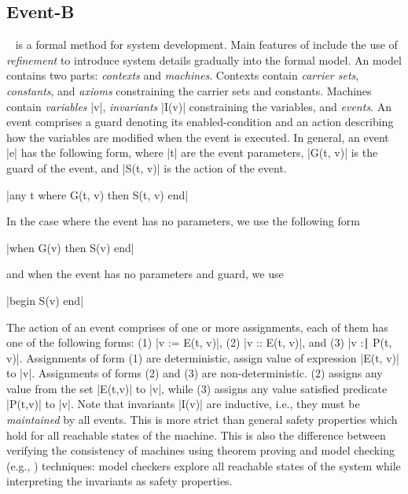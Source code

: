 
\subsection{Event-B}
\label{sec:eventb}

\EventB~\cite{abrial10:_model_event_b} is a formal method for system
development.  Main features of \EventB include the use of
\emph{refinement} to introduce system details gradually into the
formal model.  An \EventB model contains two parts: \emph{contexts} and \emph{machines}. Contexts contain \emph{carrier sets}, \emph{constants}, and \emph{axioms} constraining the carrier sets and constants.  Machines contain \emph{variables} |v|, \emph{invariants} |I(v)| constraining the variables, and \emph{events}. An event comprises a guard denoting its enabled-condition and an action describing how the variables are modified when the event is executed.  In general, an event |e| has the following form, where |t| are the event parameters, |G(t, v)| is the guard of the event, and |S(t, v)| is the action of the event.
\begin{center}
  |any t where G(t, v) then S(t, v) end|
\end{center}
In the case where the event has no parameters, we use the following form
\begin{center}
  |when G(v) then S(v) end|
\end{center}
and when the event has no parameters and guard, we use
\begin{center}
  |begin S(v) end|
\end{center}
The action of an event comprises of one or more assignments, each of them has one of the following forms: (1) |v := E(t, v)|, (2) |v :: E(t, v)|, and (3) |v :∣ P(t, v)|.  Assignments of form (1) are deterministic, assign value of expression |E(t, v)| to |v|.  Assignments of forms (2) and (3) are non-deterministic. (2) assigns any value from the set |E(t,v)| to |v|, while (3) assigns any value satisfied predicate |P(t,v)| to |v|.
Note that invariants |I(v)| are inductive, i.e., they must be \emph{maintained} by all events. This is more strict than general safety properties which hold for all reachable states of the \EventB machine.  This is also the difference between verifying the consistency of \EventB machines using theorem proving and model checking (e.g., \PROB) techniques: model checkers explore all reachable states of the system while interpreting the invariants as safety properties.

